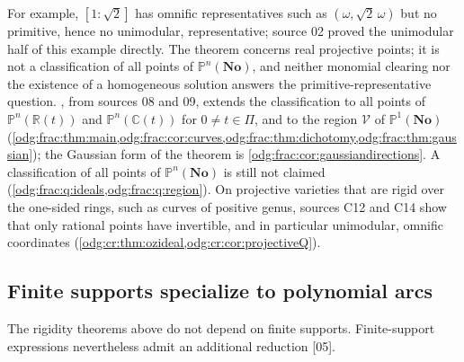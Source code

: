\documentclass[11pt,oneside]{article}
\numberwithin{equation}{section}
\theoremstyle{definition}
\theoremstyle{remark}
\newcommand{\No}{\mathbf{No}}
\newcommand{\R}{\mathbb R}
\newcommand{\C}{\mathbb C}
\newcommand{\src}[1]{\textup{\textsf{\small[#1]}}}
\newcommand{\Vreg}{\mathcal V}
\begin{document}
For example, $[1:\sqrt2]$ has omnific representatives such as
$(\omega,\sqrt2\,\omega)$ but no primitive, hence no unimodular,
representative; source 02 proved the unimodular half of this example
directly. The theorem concerns real projective points; it is not a
classification of all points of $\mathbb P^n(\No)$, and neither monomial
clearing nor the existence of a homogeneous solution answers the
primitive-representative question. , from sources
08 and 09, extends the classification to all points of $\mathbb P^n(\R(t))$
and $\mathbb P^n(\C(t))$ for $0\ne t\in\Pi$, and to the region $\Vreg$ of
$\mathbb P^1(\No)$ (\cref{odg:frac:thm:main,odg:frac:cor:curves,odg:frac:thm:dichotomy,odg:frac:thm:gaussian});
the Gaussian form of the theorem is \cref{odg:frac:cor:gaussiandirections}.
A classification of all points of $\mathbb P^n(\No)$ is still not claimed
(\cref{odg:frac:q:ideals,odg:frac:q:region}). On projective varieties that are rigid
over the one-sided rings, such as curves of positive genus, sources C12 and C14 show
that only rational points have invertible, and in particular unimodular, omnific
coordinates (\cref{odg:cr:thm:ozideal,odg:cr:cor:projectiveQ}).

\subsection{Finite supports specialize to polynomial arcs}

The rigidity theorems above do not depend on finite supports. Finite-support
expressions nevertheless admit an additional reduction \src{05}.
\end{document}
